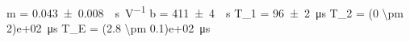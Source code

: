 m = \SI{0.043 \pm 0.008}{\per\second\per\volt}
b = \SI{411 \pm 4}{\per\second}
T_1 = \SI{96 \pm 2}{\micro\second}
T_2 = \SI{(0 \pm 2)e+02}{\micro\second}
T_E = \SI{(2.8 \pm 0.1)e+02}{\micro\second}
